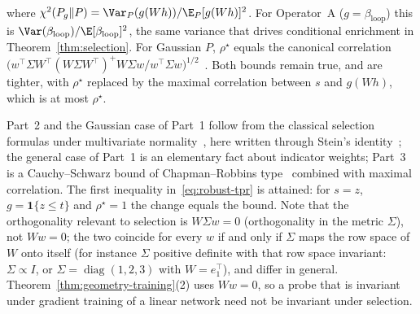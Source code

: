 \begin{theorem}
\begin{enumerate}
\begin{align}
  \end{align}
  where $\chi^2(P_g \| P) = \Var_P(g(Wh)) / \E_P[g(Wh)]^2$. For Operator~A ($g = \beta_{\mathrm{loop}}$) this is $\Var(\beta_{\mathrm{loop}})/\E[\beta_{\mathrm{loop}}]^2$, the same variance that drives conditional enrichment in Theorem~\ref{thm:selection}. For Gaussian $P$, $\rho^\star$ equals the canonical correlation $\big(w^\top \Sigma W^\top (W\Sigma W^\top)^{+} W \Sigma w / w^\top \Sigma w\big)^{1/2}$~\cite{lancaster1957,kolmogorov1960}. Both bounds remain true, and are tighter, with $\rho^\star$ replaced by the maximal correlation between $s$ and $g(Wh)$, which is at most $\rho^\star$.
\end{enumerate}
\end{theorem}

Part~2 and the Gaussian case of Part~1 follow from the classical selection formulas under multivariate normality~\cite{pearson1903,aitken1934,lawley1943}, here written through Stein's identity~\cite{stein1981}; the general case of Part~1 is an elementary fact about indicator weights; Part~3 is a Cauchy--Schwarz bound of Chapman--Robbins type~\cite{chapman1951} combined with maximal correlation. The first inequality in~\eqref{eq:robust-tpr} is attained: for $s = z$, $g = \mathbf{1}\{z \le t\}$ and $\rho^\star = 1$ the change equals the bound. Note that the orthogonality relevant to selection is $W\Sigma w = 0$ (orthogonality in the metric $\Sigma$), not $Ww = 0$; the two coincide for every $w$ if and only if $\Sigma$ maps the row space of $W$ onto itself (for instance $\Sigma$ positive definite with that row space invariant: $\Sigma\propto I$, or $\Sigma=\operatorname{diag}(1,2,3)$ with $W=e_1^\top$), and differ in general. Theorem~\ref{thm:geometry-training}(2) uses $Ww = 0$, so a probe that is invariant under gradient training of a linear network need not be invariant under selection.

